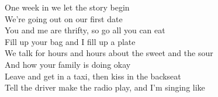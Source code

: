 \setlength{\columnseprule}{0pt}
One week in we let the story begin\\
We're going out on our first date\\
You and me are thrifty, so go all you can eat\\
Fill up your bag and I fill up a plate\\
We talk for hours and hours about the sweet and the sour\\
And how your family is doing okay\\
Leave and get in a taxi, then kiss in the backseat\\
Tell the driver make the radio play, and I'm singing like